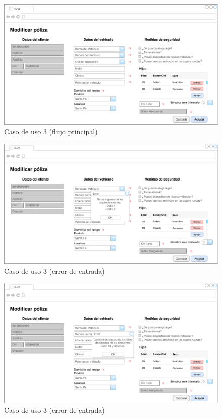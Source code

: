 \documentclass[12pt]{article}
\begin{document}


\vfill
\begin{figure}[h!]
\includegraphics[width=\textwidth]{CU3/CU-031.pdf}
\caption{Caso de uso 3 (flujo principal)}
\end{figure}
\vfill



\vfill
\begin{figure}[h!]
\includegraphics[width=\textwidth]{CU3/CU-032.pdf}
\caption{Caso de uso 3 (error de entrada)}
\end{figure}
\vfill

\vfill
\begin{figure}[h!]
\includegraphics[width=\textwidth]{CU3/CU-033.pdf}
\caption{Caso de uso 3 (error de entrada)}
\end{figure}
\vfill
\end{document}
